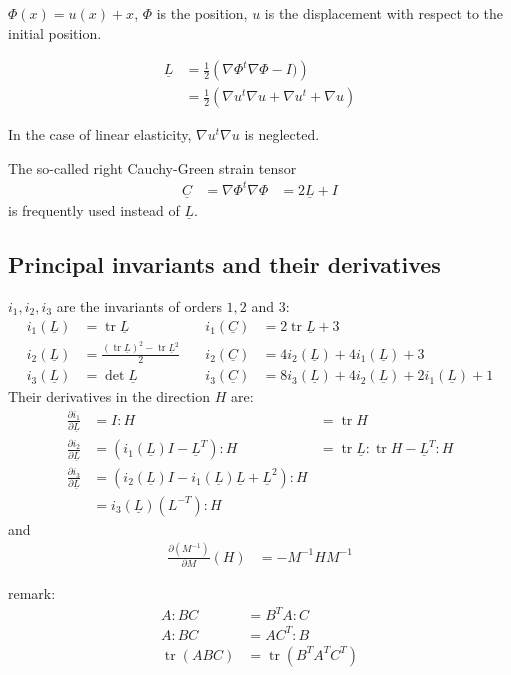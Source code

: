 \documentclass{article}
\newcommand{\TL}{\ensuremath{\underline{L}}}
\newcommand{\TC}{\ensuremath{\underline{C}}}
\newcommand{\DU}{\ensuremath{\nabla u}}
\newcommand{\DUt}{\ensuremath{\nabla u^t}}
\DeclareMathOperator{\Det}{det}
\DeclareMathOperator{\Trace}{tr}
\begin{document}
$\Phi(x) = u(x) + x$, $\Phi$ is the position, $u$ is the displacement with respect to the initial position.

\begin{align}
\TL &= \frac{1}{2}\left(\nabla\Phi^t\nabla\Phi - I)\right)\\
&= \frac{1}{2}\left(\DUt\DU + \DUt + \DU\right)
\end{align}

In the case of linear elasticity, $\DUt\DU$ is neglected.

The so-called right Cauchy-Green strain tensor
\begin{align}
\TC &= \nabla\Phi^t\nabla\Phi &= 2\TL + I
\end{align}
is frequently used instead of $\TL$.

\subsection{Principal invariants and their derivatives}
$i_1,i_2,i_3$ are the invariants of orders $1,2$ and $3$:
\begin{align}
  i_1(\TL) &= \Trace\TL &i_1(\TC) &= 2\Trace\TL + 3\\
  i_2(\TL) &= \frac{(\Trace\TL)^2 - \Trace\TL^2}{2}\quad& i_2(\TC)&=4i_2(\TL)+4i_1(\TL)+3\\
  i_3(\TL) &= \Det\TL &i_3(\TC) &= 8i_3(\TL) + 4i_2(\TL) + 2i_1(\TL) + 1
\end{align}
Their derivatives in the direction $H$ are:
\begin{align}
  \frac{\partial i_1}{\partial\TL} &= I:H &= \Trace H\\
  \frac{\partial i_2}{\partial\TL} &= (i_1(\TL)I - \TL^T):H &= \Trace \TL:\Trace H - \TL^T:H\\
  \frac{\partial i_3}{\partial\TL} &= (i_2(\TL)I - i_1(\TL)\TL + \TL^2):H \\
                  &= i_3(\TL)(L^{-T}):H
\end{align}
and
\begin{align}
\frac{\partial (M^{-1})}{\partial M}(H) &= -M^{-1}HM^{-1}
\end{align}

remark:
\begin{align}
  A:BC &= B^TA:C\\
  A:BC &= AC^T:B\\
  \Trace(ABC) &= \Trace(B^TA^TC^T)
\end{align}
\end{document}
